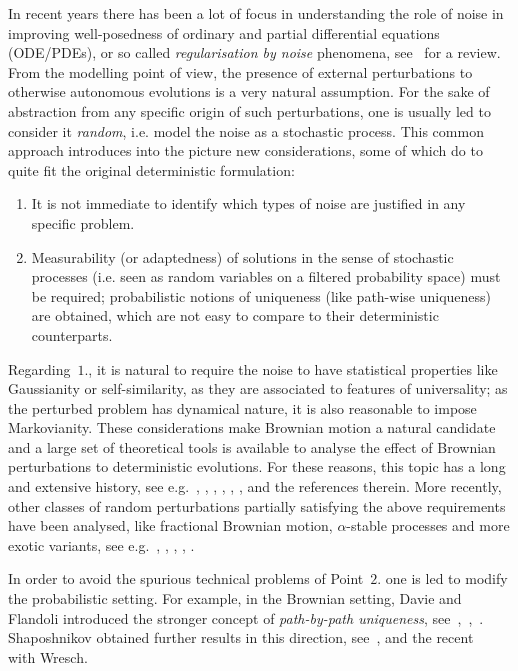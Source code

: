 \documentclass[10pt]{article}
\newcommand{\tmtextit}[1]{{\itshape{#1}}}
\begin{document}
In recent years there has been a lot of focus in understanding the role of
noise in improving well-posedness of ordinary and partial differential
equations (ODE/PDEs), or so called \tmtextit{regularisation by noise}
phenomena, see~{\cite{flandoli}} for a review. From the modelling point of
view, the presence of external perturbations to otherwise autonomous
evolutions is a very natural assumption. For the sake of abstraction from any
specific origin of such perturbations, one is usually led to consider it
\tmtextit{random}, i.e. model the noise as a stochastic process. This common
approach introduces into the picture new considerations, some of which do to
quite fit the original deterministic formulation:
\begin{enumerate}
  \item It is not immediate to identify which types of noise are justified in
  any specific problem.
  
  \item Measurability (or adaptedness) of solutions in the sense of stochastic
  processes (i.e. seen as random variables on a filtered probability space)
  must be required; probabilistic notions of uniqueness (like path-wise
  uniqueness) are obtained, which are not easy to compare to their
  deterministic counterparts.
\end{enumerate}
Regarding~$1$., it is natural to require the noise to have statistical
properties like Gaussianity or self-similarity, as they are associated to
features of universality; as the perturbed problem has dynamical nature, it is
also reasonable to impose Markovianity. These considerations make Brownian
motion a natural candidate and a large set of theoretical tools is available
to analyse the effect of Brownian perturbations to deterministic evolutions.
For these reasons, this topic has a long and extensive history, see
e.g.~{\cite{zvonkin}}, {\cite{veretennikov}}, {\cite{krylov}}, {\cite{FGP}},
{\cite{dapratoflandoli}}, {\cite{DFRV}}, {\cite{BFGM}} and the references
therein. More recently, other classes of random perturbations partially
satisfying the above requirements have been analysed, like fractional Brownian
motion, $\alpha$-stable processes and more exotic variants, see
e.g.~{\cite{nualartouknine}}, {\cite{le}}, {\cite{priola2012}},
{\cite{priola2020}}, {\cite{banosproske}}.

In order to avoid the spurious technical problems of Point~$2$. one is led to
modify the probabilistic setting. For example, in the Brownian setting, Davie
and Flandoli introduced the stronger concept of \tmtextit{path-by-path
uniqueness}, see~{\cite{davie}},~{\cite{flandoli}},~{\cite{flandoli2011}}.
Shaposhnikov obtained further results in this direction,
see~{\cite{shaposhnikov1}}, {\cite{shaposhnikov2}} and the
recent~{\cite{shaposhnikov3}} with Wresch.
\end{document}
